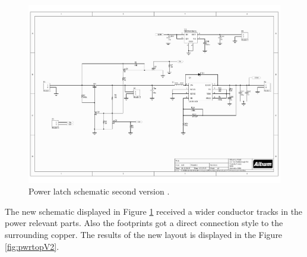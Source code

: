 \begin{figure}[ht]
	\centering
	\includegraphics[clip, trim=4cm 5cm 1cm 3cm, width=1\textwidth]{4-development/hardware/graphics/PowerLatch/PwrLatch_V2_sch.pdf}
	\caption{Power latch schematic second version .\label{development:scematicV2}}
\end{figure}
The new schematic displayed in Figure \ref{development:scematicV2} received a wider conductor tracks in the power relevant parts. Also the footprints got a direct connection style to the surrounding copper. The results of the new layout is displayed in the Figure \ref{fig:pwrtopV2}.

